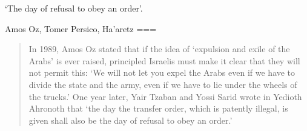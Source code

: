 ‘The day of refusal to obey an order’.

Amos Oz, Tomer Persico, Ha’aretz
===
\begin{quote}
In 1989, Amos Oz stated that if the idea of ‘expulsion and exile of the Arabs’ is ever raised, principled Israelis must make it clear that they will not permit this: ‘We will not let you expel the Arabs even if we have to divide the state and the army, even if we have to lie under the wheels of the trucks.’ One year later, Yair Tzaban and Yossi Sarid wrote in Yedioth Ahronoth that ‘the day the transfer order, which is patently illegal, is given shall also be the day of refusal to obey an order.’
\end{quote}
\nocite{persico2024}